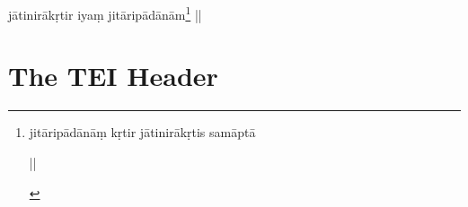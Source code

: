 \documentclass[article,12pt,a4paper]{memoir}%
\begin{document}
		\pstart
		\begin{center}
	      jātinirākṛtir iyaṃ jitāripādānām\footnote{\begin{english}\begin{sanskrit}jitāripādānāṃ kṛtir jātinirākṛtis samāptā\end{sanskrit} || \cite{jāni-I}\end{english}} ||
		\end{center}
		\pend
		
	      
	    
	    \endnumbering%
	    
     \backmatter 
	 \chapter{The TEI Header}
\end{document}
